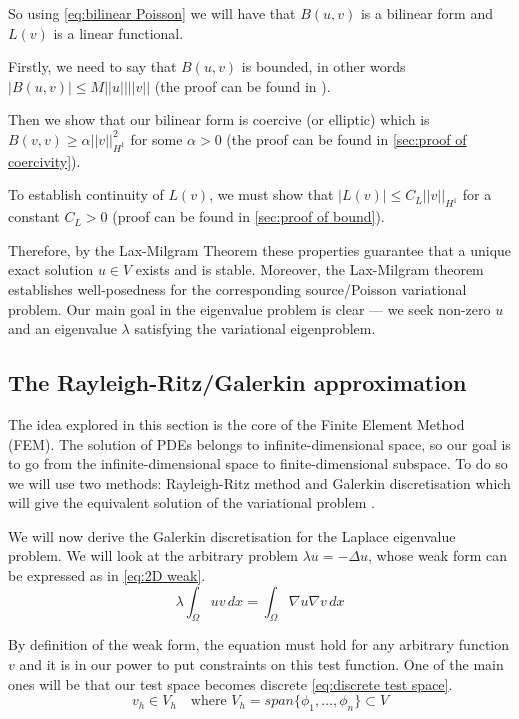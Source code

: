\documentclass[acmsmall,screen]{MapleTrans}
\begin{document}
So using \eqref{eq:bilinear Poisson} we will have that $B(u, v)$ is a bilinear form and $L(v)$ is a linear functional. 

Firstly, we need to say that $B(u, v)$ is bounded, in other words $|B(u, v)| \leq M{||u||}||v||$ (the proof can be found in \cite{b8}).

Then we show that our bilinear form is coercive (or elliptic) which is $B(v, v) \geq \alpha ||v||_{H^1}^2$ for some $\alpha > 0$ (the proof can be found in \ref{sec:proof of coercivity}).

To establish continuity of $L(v)$, we must show that $|L(v)| \leq C_{L}||v||_{H^1}$ for a constant $C_{L} > 0$ (proof can be found in \ref{sec:proof of bound}).

Therefore, by the Lax-Milgram Theorem these properties guarantee that a unique exact solution $u \in V$ exists and is stable. Moreover, the Lax-Milgram theorem establishes well-posedness for the corresponding source/Poisson variational problem. 
Our main goal in the eigenvalue problem is clear --- we seek non-zero $u$ and an eigenvalue $\lambda$ satisfying the variational eigenproblem.


\subsection{The Rayleigh-Ritz/Galerkin approximation}
The idea explored in this section is the core of the Finite Element Method (FEM). The solution of PDEs belongs to infinite-dimensional space, so our goal is to go from the infinite-dimensional space to finite-dimensional subspace. 
To do so we will use two methods: Rayleigh-Ritz method and Galerkin discretisation which will give the equivalent solution of the variational problem \cite{b9}.

We will now derive the Galerkin discretisation for the Laplace eigenvalue problem. We will look at the arbitrary problem $\lambda u = -\Delta u$, whose weak form can be expressed as in \eqref{eq:2D weak}.
\begin{equation}
    \lambda \int_{\Omega}uv \, dx = \int_{\Omega}\nabla{u} \nabla{v} \, dx
    \label{eq:2D weak}
\end{equation}

By definition of the weak form, the equation must hold for any arbitrary function $v$ and it is in our power to put constraints on this test function. One of the main ones will be that our test space becomes discrete \eqref{eq:discrete test space}.
\begin{equation}
    v_h \in V_h \quad \text{where } V_h = span\{\phi_1, \dots, \phi_n\} \subset V
    \label{eq:discrete test space}
\end{equation}
\end{document}
